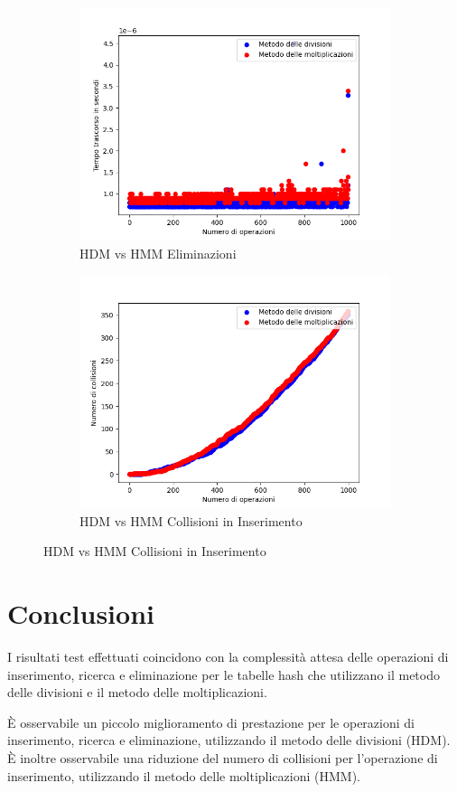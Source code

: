 \documentclass{article}
\begin{document}
\begin{figure}[h]
\begin{subfigure}{0.49\textwidth}
					\includegraphics[width = \textwidth]{HDM_HMM_Deletions}
					\caption{HDM vs HMM Eliminazioni}
				\end{subfigure}
				
				\begin{subfigure}{0.49\textwidth}
					\centering
					\includegraphics[width = \textwidth]{HDM_HMM_CollisionsOnInsertions}
					\caption{HDM vs HMM Collisioni in Inserimento}
				\end{subfigure}
				
			\end{figure}
	
	\clearpage
	\section{Conclusioni}
		I risultati test effettuati coincidono con la complessità attesa delle operazioni di inserimento, ricerca e eliminazione per le tabelle hash che utilizzano il metodo delle divisioni e il metodo delle moltiplicazioni.
		
		È osservabile un piccolo miglioramento di prestazione per le operazioni di inserimento, ricerca e eliminazione, utilizzando il metodo delle divisioni (HDM).
		È inoltre osservabile una riduzione del numero di collisioni per l'operazione di inserimento, utilizzando il metodo delle moltiplicazioni (HMM).
	
	
\end{document}
